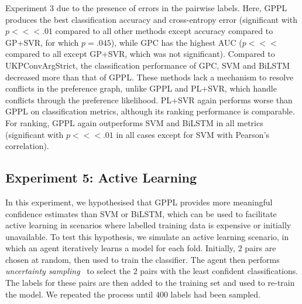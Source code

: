 Experiment 3 due to the presence of errors in the pairwise labels. 
Here, GPPL produces the best classification accuracy and cross-entropy error (significant with $p<\!\!<\!\!<.01$ compared to all other methods except accuracy compared to GP+SVR, for which $p=.045$), while GPC has the highest AUC ($p<\!\!<\!\!<$ compared to all except GP+SVR, which was not significant). 
Compared to UKPConvArgStrict, the classification performance of GPC, SVM and BiLSTM decreased more than that of GPPL.
These methods lack a mechanism to resolve conflicts in the preference graph, unlike GPPL and PL+SVR, which handle conflicts through the preference likelihood.  
PL+SVR again performs worse than GPPL on classification metrics, although its ranking performance is comparable. 
For ranking, GPPL again outperforms SVM and BiLSTM in all metrics (significant with $p<\!\!<\!\!<.01$ in all cases except for SVM with Pearson's correlation).



\subsection{Experiment 5: Active Learning}

In this experiment, we hypothesised that GPPL provides more meaningful confidence estimates than SVM or BiLSTM,
which can be used to facilitate active learning in scenarios where labelled training data is expensive
or initially unavailable.
To test this hypothesis, we simulate an active learning scenario, in which an agent 
iteratively learns a model for each fold. Initially, $2$ pairs are chosen at random, then used to train the classifier. The agent then performs \emph{uncertainty sampling}~\cite{settles2010active} 
to select the $2$ pairs with the least confident classifications. 
The labels for these pairs are then added to the training set and 
used to re-train the model. We repeated the process until $400$ labels had been sampled. 

